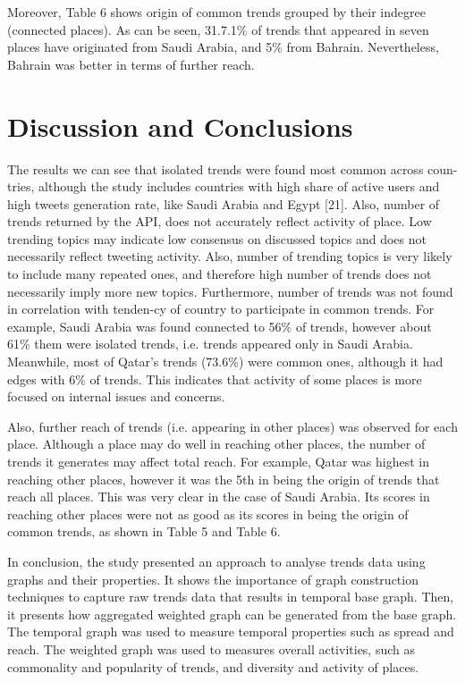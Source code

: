 \documentclass{llncs}
\begin{document}

Moreover, Table 6 shows origin of common trends grouped by their
indegree (connected places). As can be seen, 31.7.1\% of trends that
appeared in seven places have originated from Saudi Arabia, and 5\%
from Bahrain. Nevertheless, Bahrain was better in terms of further
reach.



\section{Discussion and Conclusions}\label{dissconc}

The results we can see that isolated trends were found most common
across coun-tries, although the study includes countries with high
share of active users and high tweets generation rate, like Saudi
Arabia and Egypt [21]. Also, number of trends returned by the API,
does not accurately reflect activity of place. Low trending topics may
indicate low consensus on discussed topics and does not necessarily
reflect tweeting activity. Also, number of trending topics is very
likely to include many repeated ones, and therefore high number of
trends does not necessarily imply more new topics. Furthermore, number
of trends was not found in correlation with tenden-cy of country to
participate in common trends. For example, Saudi Arabia was found
connected to 56\% of trends, however about 61\% them were isolated
trends, i.e. trends appeared only in Saudi Arabia. Meanwhile, most of
Qatar’s trends (73.6\%) were common ones, although it had edges with
6\% of trends. This indicates that activity of some places is more
focused on internal issues and concerns.

Also, further reach of trends (i.e. appearing in other places) was
observed for each place. Although a place may do well in reaching
other places, the number of trends it generates may affect total
reach. For example, Qatar was highest in reaching other places,
however it was the 5th in being the origin of trends that reach all
places. This was very clear in the case of Saudi Arabia. Its scores in
reaching other places were not as good as its scores in being the
origin of common trends, as shown in Table 5 and Table 6.

In conclusion, the study presented an approach to analyse trends data
using graphs and their properties. It shows the importance of graph
construction techniques to capture raw trends data that results in
temporal base graph. Then, it presents how aggregated weighted graph
can be generated from the base graph. The temporal graph was used to
measure temporal properties such as spread and reach. The weighted
graph was used to measures overall activities, such as commonality and
popularity of trends, and diversity and activity of places.
\end{document}

